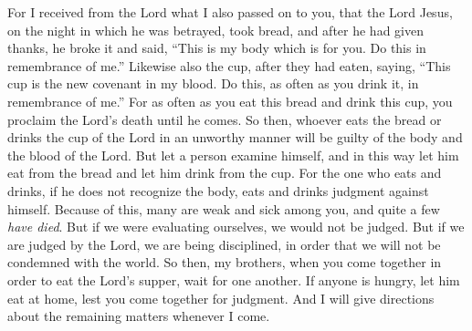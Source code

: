 \begin{biblechapter}
\verse For I received from the Lord what I also passed on to you, that the Lord Jesus, on the night in which he was betrayed, took bread,
\verse and after he had given thanks, he broke it and said, “This is my body which is for you. Do this in remembrance of me.”
\verse Likewise also the cup, after they had eaten, saying, “This cup is the new covenant in my blood. Do this, as often as you drink it, in remembrance of me.”
\verse For as often as you eat this bread and drink this cup, you proclaim the Lord’s death until he comes.
\verse So then, whoever eats the bread or drinks the cup of the Lord in an unworthy manner will be guilty of the body and the blood of the Lord.
\verse But let a person examine himself, and in this way let him eat from the bread and let him drink from the cup.
\verse For the one who eats and drinks, if he does not recognize the body, eats and drinks judgment against himself.
\verse Because of this, many are weak and sick among you, and quite a few \textit{have died}.
\verse But if we were evaluating ourselves, we would not be judged.
\verse But if we are judged by the Lord, we are being disciplined, in order that we will not be condemned with the world.
\verse So then, my brothers, when you come together in order to eat the Lord’s supper, wait for one another.
\verse If anyone is hungry, let him eat at home, lest you come together for judgment. And I will give directions about the remaining matters whenever I come.
\end{biblechapter}

